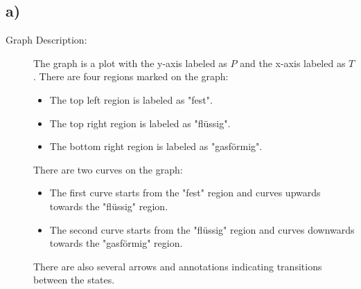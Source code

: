 

\subsection*{a)}

\begin{description}
    \item[Graph Description:] The graph is a plot with the y-axis labeled as \( P \) and the x-axis labeled as \( T \). There are four regions marked on the graph:
    \begin{itemize}
        \item The top left region is labeled as "fest".
        \item The top right region is labeled as "flüssig".
        \item The bottom right region is labeled as "gasförmig".
    \end{itemize}
    There are two curves on the graph:
    \begin{itemize}
        \item The first curve starts from the "fest" region and curves upwards towards the "flüssig" region.
        \item The second curve starts from the "flüssig" region and curves downwards towards the "gasförmig" region.
    \end{itemize}
    There are also several arrows and annotations indicating transitions between the states.
\end{description}
